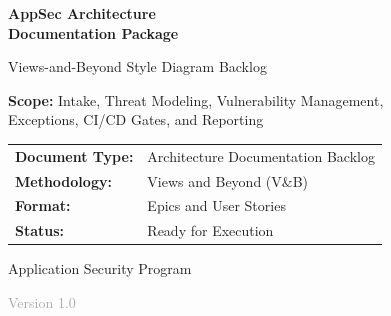 \documentclass[11pt,letterpaper]{article}
\begin{document}
\hypersetup{pageanchor=false}%
\begin{titlepage}
    \centering
    \vspace*{2cm}

    {\Huge\bfseries\color{primaryblue} AppSec Architecture\\[0.3cm] Documentation Package\par}

    \vspace{1cm}

    {\Large\color{accentblue} Views-and-Beyond Style Diagram Backlog\par}

    \vspace{2cm}

    \begin{tcolorbox}[
        colback=lightgray,
        colframe=primaryblue,
        width=0.85\textwidth,
        arc=5pt,
        boxrule=1.5pt
    ]
    \centering
    \large
    \textbf{Scope:} Intake, Threat Modeling, Vulnerability Management,\\
    Exceptions, CI/CD Gates, and Reporting
    \end{tcolorbox}

    \vspace{2cm}

    \begin{tabular}{ll}
        \textbf{Document Type:} & Architecture Documentation Backlog \\[0.3cm]
        \textbf{Methodology:} & Views and Beyond (V\&B) \\[0.3cm]
        \textbf{Format:} & Epics and User Stories \\[0.3cm]
        \textbf{Status:} & Ready for Execution \\
    \end{tabular}

    \vfill

    {\large Application Security Program\par}

    \vspace{0.5cm}

    {\small\textcolor{darkgray}{Version 1.0}\par}

\end{titlepage}\hypersetup{pageanchor=true}
\end{document}
